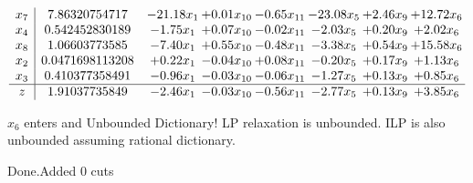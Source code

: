 \documentclass[8pt]{article}
\begin{document}
 \[\begin{array}{c| c c@{\hskip 2pt} c@{\hskip 2pt} c@{\hskip 2pt} c@{\hskip 2pt} c@{\hskip 2pt} c@{\hskip 2pt} }
 x_{7}   &  7.86320754717 & -21.18 x_{1} & +  0.01 x_{10} & -0.65 x_{11} & -23.08 x_{5} & +  2.46 x_{9} & + 12.72 x_{6}\\
 x_{4}   &  0.542452830189 & -1.75 x_{1} & +  0.07 x_{10} & -0.02 x_{11} & -2.03 x_{5} & +  0.20 x_{9} & +  2.02 x_{6}\\
 x_{8}   &  1.06603773585 & -7.40 x_{1} & +  0.55 x_{10} & -0.48 x_{11} & -3.38 x_{5} & +  0.54 x_{9} & + 15.58 x_{6}\\
 x_{2}   &  0.0471698113208 & +  0.22 x_{1} & -0.04 x_{10} & +  0.08 x_{11} & -0.20 x_{5} & +  0.17 x_{9} & +  1.13 x_{6}\\
 x_{3}   &  0.410377358491 & -0.96 x_{1} & -0.03 x_{10} & -0.06 x_{11} & -1.27 x_{5} & +  0.13 x_{9} & +  0.85 x_{6}\\
\hline
z    &  1.91037735849 & -2.46 x_{1} & -0.03 x_{10} & -0.56 x_{11} & -2.77 x_{5} & +  0.13 x_{9} & +  3.85 x_{6}\\
\end{array}\]


 $ x_{6} $ enters and Unbounded Dictionary!
 LP relaxation is unbounded. ILP is also unbounded assuming rational dictionary. 

Done.Added 0 cuts 
\end{document}
